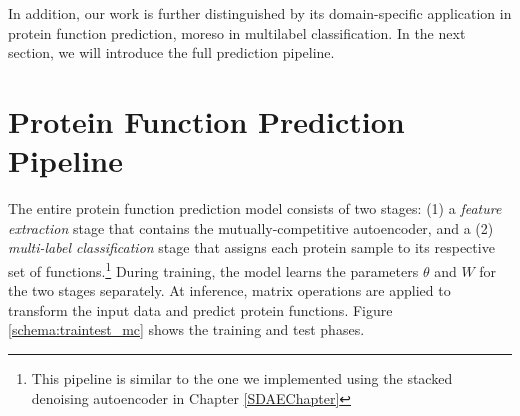 \par In addition, our work is further distinguished by its domain-specific
application in protein function prediction, moreso in multilabel
classification. In the next section, we will introduce the full prediction
pipeline.

\section{Protein Function Prediction Pipeline}
\label{PFPPipeline}

\par The entire protein function prediction model consists of two stages: (1)
a \textit{feature extraction} stage that contains the mutually-competitive
autoencoder, and a (2) \textit{multi-label classification} stage that assigns
each protein sample to its respective set of functions.\footnote{This
pipeline is similar to the one we implemented using the stacked denoising
autoencoder in Chapter \ref{SDAEChapter}} During training, the model learns
the parameters $\theta$ and $W$ for the two stages separately. At inference,
matrix operations are applied to transform the input data and predict protein
functions. Figure \ref{schema:traintest_mc} shows the training and test
phases.

